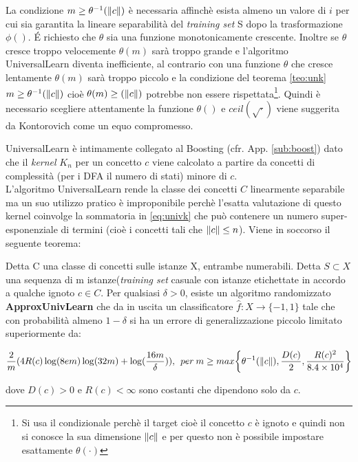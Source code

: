 La condizione $m \geq \theta^{-1}(\lVert c\rVert)$ è necessaria affinchè esista almeno un valore di $i$ per cui sia garantita la lineare separabilità del \textit{training set} S dopo la trasformazione $\phi()$. \'E richiesto che $\theta$ sia una funzione monotonicamente crescente. Inoltre se $\theta$ cresce troppo velocemente $\theta(m)$ sarà troppo grande e l'algoritmo UniversalLearn diventa inefficiente, al contrario con una funzione $\theta$ che cresce lentamente $\theta(m)$ sarà troppo piccolo e la condizione del teorema \ref{teo:unk}  $m \geq  \theta^{-1}(\lVert c\rVert)$ cioè $\theta(m) \geq  (\lVert c\rVert)$ potrebbe non essere rispettata\footnote{Si usa il condizionale perchè il target cioè il concetto $c$ è ignoto e quindi non si conosce la sua dimensione $\lVert c\rVert$ e per questo non è possibile impostare esattamente $\theta(\cdot)$}. Quindi è necessario scegliere attentamente la funzione $\theta()$ e $ceil(\sqrt{\cdot})$ viene suggerita da Kontorovich come un equo compromesso.

UniversalLearn è intimamente collegato al Boosting (cfr. App. \ref{sub:boost}) dato che il \textit{kernel} $K_n$ per un concetto $c$ viene calcolato a partire da concetti di complessità (per i \ac{DFA} il numero di stati) minore di $c$. \\

L'algoritmo UniversalLearn rende la classe dei concetti $C$ linearmente separabile ma un suo utilizzo pratico è improponibile  perchè l'esatta valutazione di questo kernel coinvolge la sommatoria in \eqref{eq:univk} che può contenere un numero super-esponenziale di termini (cioè i concetti tali che $\lVert c\rVert \leq n$). Viene in soccorso il seguente teorema:

\begin{teorema}
Detta C una classe di concetti sulle istanze X, entrambe numerabili. Detta $S \subset X$ una sequenza di m istanze(\textit{training set} casuale con istanze etichettate in accordo a qualche ignoto $c \in C$. Per qualsiasi $\delta > 0$, esiste un algoritmo randomizzato \textbf{ApproxUnivLearn} che da in uscita un classificatore $\hat{f} : X \to \{-1,1\}$ tale che con probabilità almeno $1 - \delta$ si ha un errore di generalizzazione piccolo limitato superiormente da:
 
 \begin{equation*}
\frac{2}{m}(4R(c) \log(8em)\log(32m)+\log(\frac{16m}{\delta}) ),\:\: per \: m\geq  max\biggl\{\theta^{-1}(\lVert c\rVert) , \frac {D(c)}{2} , \frac{R(c)^{2}}{8.4 \times 10^{4}}\biggr\}
\end{equation*}

dove $D(c)>0$ e $R(c) < \infty$ sono costanti che dipendono solo da $c$.
\end{teorema}

